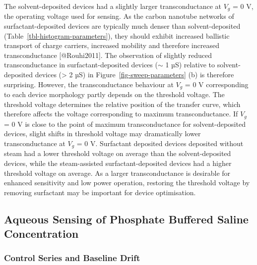 \documentclass[
  letterpaper,
  DIV=11,
  numbers=noendperiod]{scrartcl}
\begin{document}
The solvent-deposited devices had a slightly larger transconductance at
\(V_g\) = 0 V, the operating voltage used for sensing. As the carbon
nanotube networks of surfactant-deposited devices are typically much
denser than solvent-deposited (Table~\ref{tbl-histogram-parameters}),
they should exhibit increased ballistic transport of charge carriers,
increased mobility and therefore increased transconductance
{[}@Rouhi2011{]}. The observation of slightly reduced transconductance
in surfactant-deposited devices (\(\sim\) 1 µS) relative to
solvent-deposited devices (\textgreater{} 2 µS) in
Figure~\ref{fig-sweep-parameters} (b) is therefore surprising. However,
the transconductance behaviour at \(V_g\) = 0 V corresponding to each
device morphology partly depends on the threshold voltage. The threshold
voltage determines the relative position of the transfer curve, which
therefore affects the voltage corresponding to maximum transconductance.
If \(V_g\) = 0 V is close to the point of maximum transconductance for
solvent-deposited devices, slight shifts in threshold voltage may
dramatically lower transconductance at \(V_g\) = 0 V. Surfactant
deposited devices deposited without steam had a lower threshold voltage
on average than the solvent-deposited devices, while the steam-assisted
surfactant-deposited devices had a higher threshold voltage on average.
As a larger transconductance is desirable for enhanced sensitivity and
low power operation, restoring the threshold voltage by removing
surfactant may be important for device optimisation.

\hypertarget{sec-dummy-sensing}{%
\subsection{Aqueous Sensing of Phosphate Buffered Saline
Concentration}\label{sec-dummy-sensing}}

\hypertarget{sec-baseline-drift}{%
\subsubsection{Control Series and Baseline
Drift}\label{sec-baseline-drift}}
\end{document}
